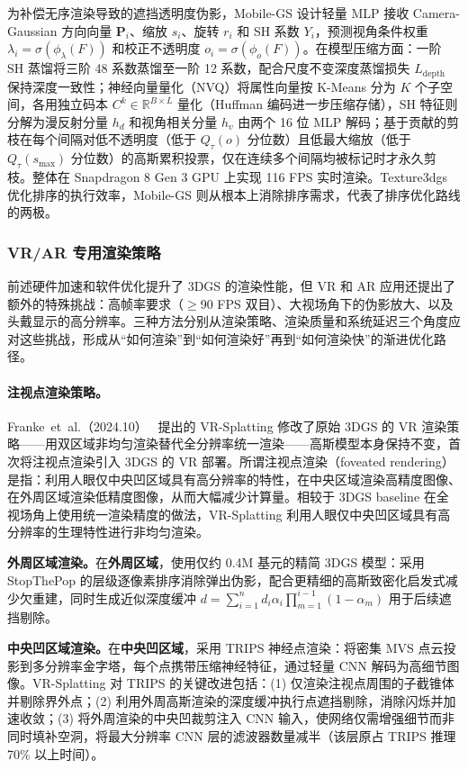 为补偿无序渲染导致的遮挡透明度伪影，Mobile-GS 设计轻量 MLP 接收 Camera-Gaussian 方向向量 $\mathbf{P}_i$、缩放 $s_i$、旋转 $r_i$ 和 SH 系数 $Y_i$，预测视角条件权重 $\lambda_i=\sigma(\phi_\lambda(F))$ 和校正不透明度 $o_i=\sigma(\phi_o(F))$。在模型压缩方面：一阶 SH 蒸馏将三阶 48 系数蒸馏至一阶 12 系数，配合尺度不变深度蒸馏损失 $L_{\text{depth}}$ 保持深度一致性；神经向量量化（NVQ）将属性向量按 K-Means 分为 $K$ 个子空间，各用独立码本 $C^k\!\in\!\mathbb{R}^{B\times L}$ 量化（Huffman 编码进一步压缩存储），SH 特征则分解为漫反射分量 $h_d$ 和视角相关分量 $h_v$ 由两个 16 位 MLP 解码；基于贡献的剪枝在每个间隔对低不透明度（低于 $Q_\tau(o)$ 分位数）且低最大缩放（低于 $Q_\tau(s_{\max})$ 分位数）的高斯累积投票，仅在连续多个间隔均被标记时才永久剪枝。整体在 Snapdragon 8 Gen 3 GPU 上实现 116 FPS 实时渲染。Texture3dgs 优化排序的执行效率，Mobile-GS 则从根本上消除排序需求，代表了排序优化路线的两极。

\subsubsection{VR/AR 专用渲染策略}

前述硬件加速和软件优化提升了 3DGS 的渲染性能，但 VR 和 AR 应用还提出了额外的特殊挑战：高帧率要求（$\geq$90 FPS 双目）、大视场角下的伪影放大、以及头戴显示的高分辨率。三种方法分别从渲染策略、渲染质量和系统延迟三个角度应对这些挑战，形成从“如何渲染”到“如何渲染好”再到“如何渲染快”的渐进优化路径。

\paragraph{注视点渲染策略。}

Franke~et~al.（2024.10）~\cite{2410_17932} 提出的 VR-Splatting 修改了原始 3DGS 的 VR 渲染策略——用双区域非均匀渲染替代全分辨率统一渲染——高斯模型本身保持不变，首次将注视点渲染引入 3DGS 的 VR 部署。所谓注视点渲染（foveated rendering）是指：利用人眼仅中央凹区域具有高分辨率的特性，在中央区域渲染高精度图像、在外周区域渲染低精度图像，从而大幅减少计算量。相较于 3DGS baseline 在全视场角上使用统一渲染精度的做法，VR-Splatting 利用人眼仅中央凹区域具有高分辨率的生理特性进行非均匀渲染。

\textbf{外周区域渲染。}在\textbf{外周区域}，使用仅约 0.4M 基元的精简 3DGS 模型：采用 StopThePop 的层级逐像素排序消除弹出伪影，配合更精细的高斯致密化启发式减少欠重建，同时生成近似深度缓冲 $d = \sum_{i=1}^n d_i \alpha_i \prod_{m=1}^{i-1}(1\!-\!\alpha_m)$ 用于后续遮挡剔除。

\textbf{中央凹区域渲染。}在\textbf{中央凹区域}，采用 TRIPS 神经点渲染：将密集 MVS 点云投影到多分辨率金字塔，每个点携带压缩神经特征，通过轻量 CNN 解码为高细节图像。VR-Splatting 对 TRIPS 的关键改进包括：(1) 仅渲染注视点周围的子截锥体并剔除界外点；(2) 利用外周高斯渲染的深度缓冲执行点遮挡剔除，消除闪烁并加速收敛；(3) 将外周渲染的中央凹裁剪注入 CNN 输入，使网络仅需增强细节而非同时填补空洞，将最大分辨率 CNN 层的滤波器数量减半（该层原占 TRIPS 推理 70\% 以上时间）。

